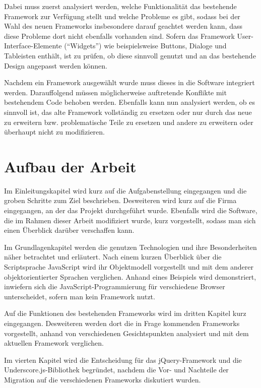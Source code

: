 Dabei muss zuerst analysiert werden, welche Funktionalität das bestehende Framework zur Verfügung
stellt und welche Probleme es gibt, sodass bei der Wahl des neuen Frameworks insbesondere darauf
geachtet werden kann, dass diese Probleme dort nicht ebenfalls vorhanden sind. Sofern das Framework
User-Interface-Elemente (\enquote{Widgets}) wie beispielsweise Buttons, Dialoge und Tableisten
enthält, ist zu prüfen, ob diese sinnvoll genutzt und an das bestehende Design angepasst werden können.

Nachdem ein Framework ausgewählt wurde muss dieses in die Software integriert werden. Darauffolgend
müssen möglicherweise auftretende Konflikte mit bestehendem Code behoben werden.
Ebenfalls kann nun analysiert werden, ob es sinnvoll ist, das alte Framework vollständig zu ersetzen
oder nur durch das neue zu erweitern bzw. problematische Teile zu ersetzen und andere zu erweitern
oder überhaupt nicht zu modifizieren.


\section{Aufbau der Arbeit}

Im Einleitungskapitel wird kurz auf die Aufgabenstellung eingegangen und die groben Schritte zum
Ziel beschrieben. Desweiteren wird kurz auf die Firma eingegangen, an der das Projekt durchgeführt
wurde.
Ebenfalls wird die Software, die im Rahmen dieser Arbeit modifiziert wurde, kurz vorgestellt, sodass
man sich einen Überblick darüber verschaffen kann.

Im Grundlagenkapitel werden die genutzen Technologien und ihre Besonderheiten näher betrachtet und
erläutert. Nach einem kurzen Überblick über die Scriptsprache JavaScript wird ihr Objektmodell
vorgestellt und mit dem anderer objektorientierter Sprachen verglichen. Anhand eines Beispiels wird
demonstriert, inwiefern sich die JavaScript-Programmierung für verschiedene Browser unterscheidet,
sofern man kein Framework nutzt.

Auf die Funktionen des bestehenden Frameworks wird im dritten Kapitel kurz eingegangen. Desweiteren
werden dort die in Frage kommenden Frameworks vorgestellt, anhand von verschiedenen Gesichtspunkten
analysiert und mit dem aktuellen Framework verglichen.

Im vierten Kapitel wird die Entscheidung für das jQuery-Framework und die Underscore.js-Bibliothek
begründet, nachdem die Vor- und Nachteile der Migration auf die verschiedenen Frameworks diskutiert
wurden.

